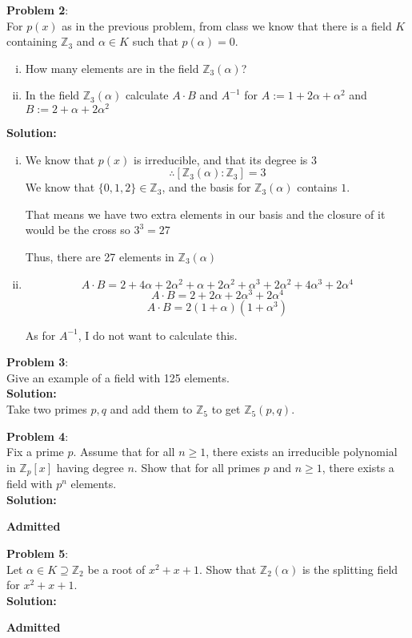 \documentclass[11pt]{article}
\newcommand{\prob}[3]{\begin{flushleft}
        \textbf{Problem #1}: \\
        #2 
		\textbf{Solution:} 
		#3

\end{flushleft}}
\newcommand{\admit}{
  \begin{flushright}
    \textbf{Admitted}
  \end{flushright}
}
\begin{document}
\prob{2}{
  For $p(x)$ as in the previous problem, from class we know that there is a field $K$ containing $\mathbb{Z}_3$ and $\alpha \in K$ such that $p(\alpha) = 0$.
  \begin{enumerate}[(i)]
    \item How many elements are in the field $\mathbb{Z}_3(\alpha)$?
    \item In the field $\mathbb{Z}_3(\alpha)$ calculate $A \cdot B$ and $A^{-1}$ for
          $A := 1 + 2 \alpha + \alpha^2$ and $B := 2 + \alpha + 2 \alpha^2$
  \end{enumerate}
}{
  \begin{enumerate}[(i)]
    \item We know that $p(x)$ is irreducible, and that its degree is $3$
          $$\therefore [\mathbb{Z}_3(\alpha) : \mathbb{Z}_3] = 3$$
          We know that $\{ 0,1,2 \} \in \mathbb{Z}_3$, and the basis for
          $\mathbb{Z}_3(\alpha)$ contains $1$.

          That means we have two extra elements in our basis and the closure of it would be the cross so $3^3 = 27$

          Thus, there are 27 elements in $\mathbb{Z}_3(\alpha)$

    \item $$A \cdot B = 2 + 4\alpha + 2\alpha^2 + \alpha + 2\alpha^2 + \alpha^3 + 2 \alpha^2 + 4\alpha^3 + 2 \alpha^4$$
          $$A \cdot B = 2 + 2\alpha + 2\alpha^3 + 2\alpha^4$$
          $$A \cdot B = 2(1 + \alpha)(1 + \alpha^3)$$

          As for $A^{-1}$, I do not want to calculate this.
  \end{enumerate}
}

\prob{3}{
  Give an example of a field with 125 elements. \\
}{ \\
  Take two primes $p,q$ and add them to $\mathbb{Z}_5$
  to get $\mathbb{Z}_5(p,q)$.
}

\prob{4}{
Fix a prime $p$. Assume that for all $n \geq 1$, there exists an irreducible polynomial in $\mathbb{Z}_p[x]$ having degree $n$. Show that for all primes $p$ and $n \geq 1$, there exists a field with $p^n$ elements. \\
}{ \\
\admit
}

\prob{5}{
  Let $\alpha \in K \supseteq \mathbb{Z}_2$ be a root of $x^2 + x + 1$.
  Show that $\mathbb{Z}_2(\alpha)$ is the splitting field for $x^2 + x + 1$. \\
}{\\
  \admit
}
\end{document}
